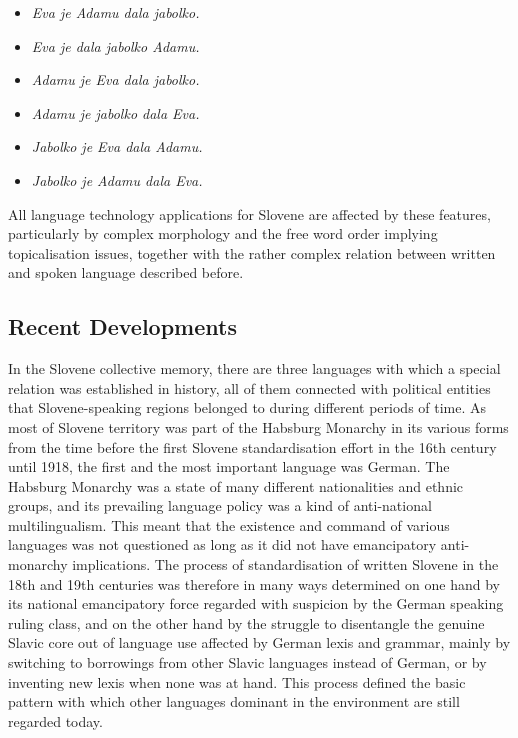 \begin{multicols}{2}
\begin{itemize}
\item \textit{Eva je Adamu dala jabolko.} 
\item \textit{Eva je dala jabolko Adamu.} 
\item \textit{Adamu je Eva dala jabolko.} 
\item \textit{Adamu je jabolko dala Eva.} 
\item \textit{Jabolko je Eva dala Adamu.} 
\item \textit{Jabolko je Adamu dala Eva.} 
\end{itemize}  

All language technology applications for Slovene are affected by these features, particularly by complex morphology and the free word order implying topicalisation issues, together with the rather complex relation between written and spoken language described before. 

\subsection{Recent Developments}

In the Slovene collective memory, there are three languages with which a special relation was established in history, all of them connected with political entities that Slovene-speaking regions belonged to during different periods of time. As most of Slovene territory was part of the Habsburg Monarchy in its various forms from the time before the first Slovene standardisation effort in the 16th century until 1918, the first and the most important language was German. The Habsburg Monarchy was a state of many different nationalities and ethnic groups, and its prevailing language policy was a kind of anti-national multilingualism. This meant that the existence and command of various languages was not questioned as long as it did not have emancipatory anti-monarchy implications. The process of standardisation of written Slovene in the 18th and 19th centuries was therefore in many ways determined on one hand by its national emancipatory force regarded with suspicion by the German speaking ruling class, and on the other hand by the struggle to disentangle the genuine Slavic core out of language use affected by German lexis and grammar, mainly by switching to borrowings from other Slavic languages instead of German, or by inventing new lexis when none was at hand. This process defined the basic pattern with which other languages dominant in the environment are still regarded today.


\end{multicols}
